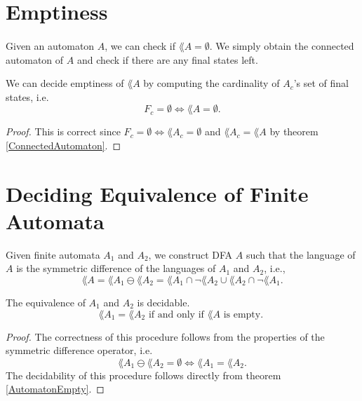 \documentclass[11pt,a4paper,oneside]{book}
\begin{document}

        \section{Emptiness}
            \paragraph{}
                Given an automaton $A$, we can check if $\lang{A} = \emptyset$. We simply obtain the connected automaton of $A$ and check if there are any final states left. 
                \begin{theorem} We can decide emptiness of $\lang{A}$ by computing the cardinality of $A_c$'s set of final states, i.e.
                    \label{AutomatonEmpty}
                    \[
                        F_c = \emptyset \Longleftrightarrow \lang{A} = \emptyset.
                    \]
                \end{theorem}

            \begin{proof}
                This is correct since $F_c = \emptyset \Leftrightarrow \lang{A_c} = \emptyset$ and $\lang{A_c} = \lang{A}$ by theorem \ref{ConnectedAutomaton}.
            \end{proof}


        \section{Deciding Equivalence of Finite Automata}
            Given finite automata $A_1$ and $A_2$, we construct DFA $A$ such that the language of $A$ is the symmetric difference of the languages of $A_1$ and $A_2$, i.e.,
            \[ 
                \lang{A} = \lang{A_1} \ominus \lang{A_2} = \lang{A_1} \cap \neg \lang{A_2} \cup \lang{A_2} \cap \neg \lang{A_1}.
            \]
            \begin{theorem} The equivalence of $A_1$ and $A_2$ is decidable. 
                \[
                    \lang{A_1} = \lang{A_2} \mbox{ if and only if } \lang{A} \mbox{ is empty. }
                \]
            \end{theorem}
            \begin{proof}
                The correctness of this procedure follows from the properties of the symmetric difference operator, i.e.
                \[ 
                    \lang{A_1} \ominus \lang{A_2} = \emptyset \Leftrightarrow \lang{A_1} = \lang{A_2}.
                \]
                The decidability of this procedure follows directly from theorem \ref{AutomatonEmpty}.
            \end{proof}
\end{document}
